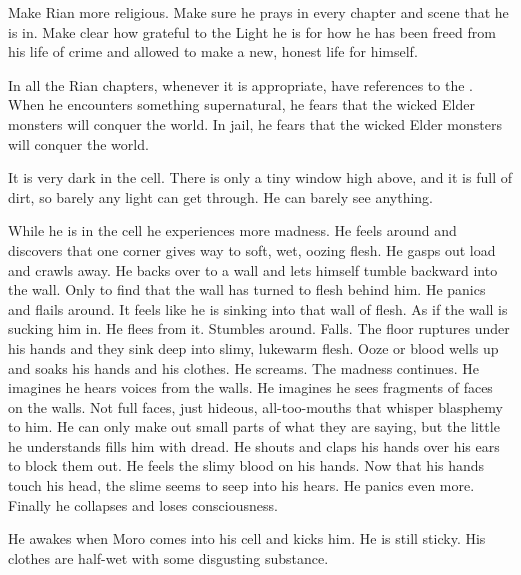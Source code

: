 Make Rian more religious.
Make sure he prays in every chapter and scene that he is in.
Make clear how grateful to the Light he is for how he has been freed from his life of crime and allowed to make a new, honest life for himself.
    
In all the Rian chapters, whenever it is appropriate, have references to the . 
When he encounters something supernatural, he fears that the wicked Elder monsters will conquer the world. 
In jail, he fears that the wicked Elder monsters will conquer the world. 

It is very dark in the cell.
There is only a tiny window high above, and it is full of dirt, so barely any light can get through.
He can barely see anything. 

While he is in the cell he experiences more madness. 
He feels around and discovers that one corner gives way to soft, wet, oozing flesh. 
He gasps out load and crawls away. 
He backs over to a wall and lets himself tumble backward into the wall.
Only to find that the wall has turned to flesh behind him. 
He panics and flails around.
It feels like he is sinking into that wall of flesh.
As if the wall is sucking him in. 
He flees from it. 
Stumbles around. 
Falls. 
The floor ruptures under his hands and they sink deep into slimy, lukewarm flesh.
Ooze or blood wells up and soaks his hands and his clothes. 
He screams. 
The madness continues.
He imagines he hears voices from the walls. 
He imagines he sees fragments of faces on the walls.
Not full faces, just hideous, all-too-\human mouths that whisper blasphemy to him. 
He can only make out small parts of what they are saying, but the little he understands fills him with dread. 
He shouts and claps his hands over his ears to block them out.
He feels the slimy blood on his hands. 
Now that his hands touch his head, the slime seems to seep into his hears. 
He panics even more. 
Finally he collapses and loses consciousness.





\begin{comment}
  \section{Moro rescues Rian}
\end{comment}
He awakes when Moro comes into his cell and kicks him.
He is still sticky.
His clothes are half-wet with some disgusting substance. 

